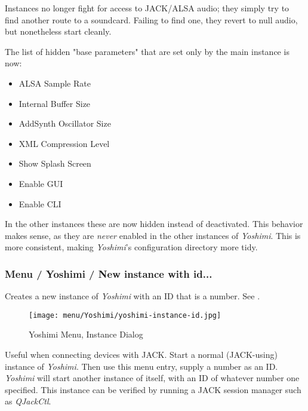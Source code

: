 
   Instances no longer fight for access to JACK/ALSA audio; they simply
   try to find another route to a soundcard. Failing to find one,
   they revert to null audio, but nonetheless start cleanly.

   The list of hidden "base parameters" that are set only by the main instance
   is now:

   \begin{itemize}
      \item ALSA Sample Rate
      \item Internal Buffer Size
      \item AddSynth Oscillator Size
      \item XML Compression Level
      \item Show Splash Screen
      \item Enable GUI
      \item Enable CLI
   \end{itemize}

   In the other instances these are now hidden instead of deactivated.  This
   behavior makes sense, as they are \textsl{never} enabled in the other
   instances of \textsl{Yoshimi}. This is more consistent, making
   \textsl{Yoshimi}'s configuration directory more tidy.

\iffalse


\subsubsection{Menu / Yoshimi / New instance with id...}
\label{subsubsec:menu_yoshimi_new_instance_with_id}

   Creates a new instance of \textsl{Yoshimi}
   with an ID that is a number.
   See .

\begin{figure}[H]
   \centering
   \texttt{[image: menu/Yoshimi/yoshimi-instance-id.jpg]}
   \caption{Yoshimi Menu, Instance Dialog}
   \label{fig:yoshimi_instance_dialog}
\end{figure}

   Useful when connecting devices with JACK.
   Start a normal (JACK-using) instance of \textsl{Yoshimi}.
   Then use this menu entry, supply a number as an ID.
   \textsl{Yoshimi} will start another instance
   of itself, with an ID of whatever number one specified.
   This instance can be verified by running a JACK session manager such as
   \textsl{QJackCtl}.

